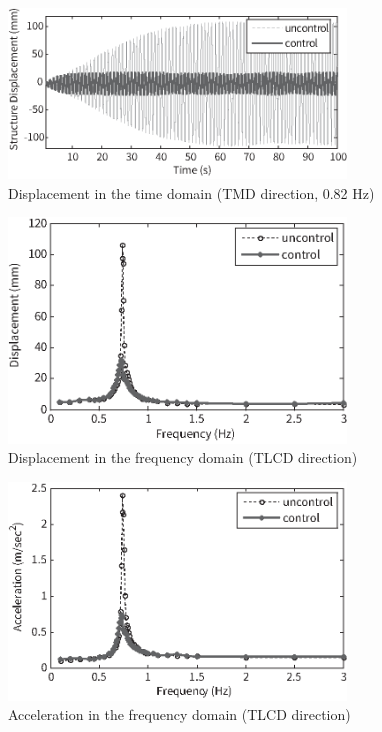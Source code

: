 \begin{figure}[ht]
\centering
\includegraphics[width=0.8\textwidth] {figure/5-8.eps}
\caption{Displacement in the time domain (TMD direction, 0.82 Hz)}
\label{fig:5-8}
\end{figure}

\begin{figure}[ht]
\centering
\includegraphics[width=0.8\textwidth] {figure/5-9.eps}
\caption{Displacement in the frequency domain (TLCD direction)}
\label{fig:5-9}
\end{figure}

\begin{figure}[ht]
\centering
\includegraphics[width=0.8\textwidth] {figure/5-10.eps}
\caption{Acceleration in the frequency domain (TLCD direction)}
\label{fig:5-10}
\end{figure}

